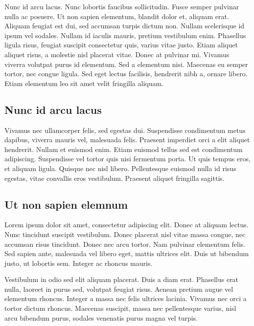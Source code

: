 Nunc id arcu lacus. Nunc lobortis faucibus sollicitudin. Fusce semper pulvinar nulla ac posuere. Ut non sapien elementum, blandit dolor et, aliquam erat. Aliquam feugiat est dui, sed accumsan turpis dictum non. Nullam scelerisque id ipsum vel sodales. Nullam id iaculis mauris, pretium vestibulum enim. Phasellus ligula risus, feugiat suscipit consectetur quis, varius vitae justo. Etiam aliquet aliquet risus, a molestie nisl placerat vitae. Donec at pulvinar mi. Vivamus viverra volutpat purus id elementum. Sed a elementum nisi. Maecenas eu semper tortor, nec congue ligula. Sed eget lectus facilisis, hendrerit nibh a, ornare libero. Etiam elementum leo sit amet velit fringilla aliquam.

\subsection{Nunc id arcu lacus}

Vivamus nec ullamcorper felis, sed egestas dui. Suspendisse condimentum metus dapibus, viverra mauris vel, malesuada felis. Praesent imperdiet orci a elit aliquet hendrerit. Nullam et euismod enim. Etiam euismod tellus sed est condimentum adipiscing. Suspendisse vel tortor quis nisi fermentum porta. Ut quis tempus eros, et aliquam ligula. Quisque nec nisl libero. Pellentesque euismod nulla id risus egestas, vitae convallis eros vestibulum. Praesent aliquet fringilla sagittis.

\subsection{Ut non sapien elemnum}

Lorem ipsum dolor sit amet, consectetur adipiscing elit. Donec at aliquam lectus. Nunc tincidunt suscipit vestibulum. Donec placerat nisl vitae massa congue, nec accumsan risus tincidunt. Donec nec arcu tortor. Nam pulvinar elementum felis. Sed sapien ante, malesuada vel libero eget, mattis ultrices elit. Duis ut bibendum justo, ut lobortis sem. Integer ac rhoncus mauris.

Vestibulum in odio sed elit aliquam placerat. Duis a diam erat. Phasellus erat nulla, laoreet in purus sed, volutpat feugiat risus. Aenean pretium augue vel elementum rhoncus. Integer a massa nec felis ultrices lacinia. Vivamus nec orci a tortor dictum rhoncus. Maecenas suscipit, massa nec pellentesque varius, nisl arcu bibendum purus, sodales venenatis purus magna vel turpis.